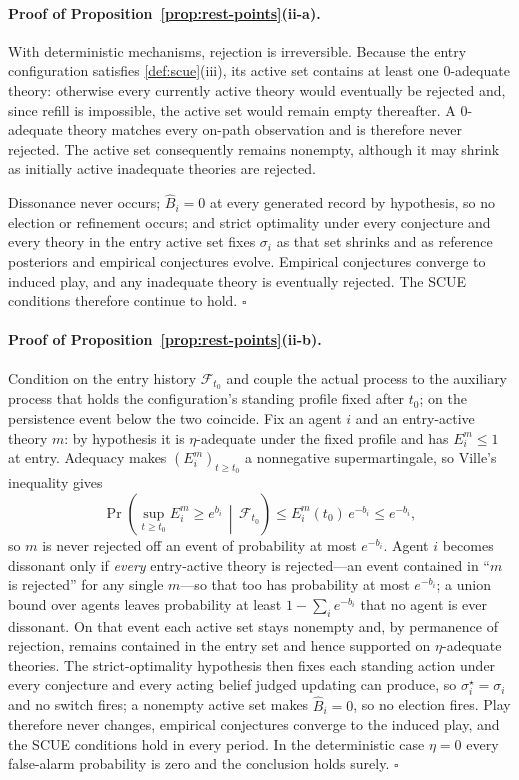 \documentclass[11pt]{article}
\theoremstyle{definition}
\begin{document}
\paragraph{Proof of Proposition~\ref{prop:rest-points}(ii-a).}
With deterministic mechanisms, rejection is irreversible.
Because the entry configuration satisfies \cref{def:scue}(iii), its active set contains at least one $0$-adequate theory: otherwise every currently active theory would eventually be rejected and, since refill is impossible, the active set would remain empty thereafter.
A $0$-adequate theory matches every on-path observation and is therefore never rejected.
The active set consequently remains nonempty, although it may shrink as initially active inadequate theories are rejected.

Dissonance never occurs; $\widehat B_i=0$ at every generated record by hypothesis, so no election or refinement occurs; and strict optimality under every conjecture and every theory in the entry active set fixes $\sigma_i$ as that set shrinks and as reference posteriors and empirical conjectures evolve.
Empirical conjectures converge to induced play, and any inadequate theory is eventually rejected.
The SCUE conditions therefore continue to hold.
\hfill$\square$

\paragraph{Proof of Proposition~\ref{prop:rest-points}(ii-b).}
Condition on the entry history $\mathcal F_{t_0}$ and couple the actual process to the auxiliary process that holds the configuration's standing profile fixed after $t_0$; on the persistence event below the two coincide.
Fix an agent $i$ and an entry-active theory $m$: by hypothesis it is $\eta$-adequate under the fixed profile and has $E_i^{m}\le1$ at entry.
Adequacy makes $(E_i^{m})_{t\ge t_0}$ a nonnegative supermartingale, so Ville's inequality gives
\[
\Pr\!\left(\sup_{t\ge t_0}E_i^{m}\ge e^{b_i}\,\middle|\,\mathcal F_{t_0}\right)
\le E_i^{m}(t_0)\,e^{-b_i}\le e^{-b_i},
\]
so $m$ is never rejected off an event of probability at most $e^{-b_i}$.
Agent $i$ becomes dissonant only if \emph{every} entry-active theory is rejected---an event contained in ``$m$ is rejected'' for any single $m$---so that too has probability at most $e^{-b_i}$; a union bound over agents leaves probability at least $1-\sum_i e^{-b_i}$ that no agent is ever dissonant.
On that event each active set stays nonempty and, by permanence of rejection, remains contained in the entry set and hence supported on $\eta$-adequate theories.
The strict-optimality hypothesis then fixes each standing action under every conjecture and every acting belief judged updating can produce, so $\sigma_i^{\star}=\sigma_i$ and no switch fires; a nonempty active set makes $\widehat B_i=0$, so no election fires.
Play therefore never changes, empirical conjectures converge to the induced play, and the SCUE conditions hold in every period.
In the deterministic case $\eta=0$ every false-alarm probability is zero and the conclusion holds surely.
\hfill$\square$
\end{document}
